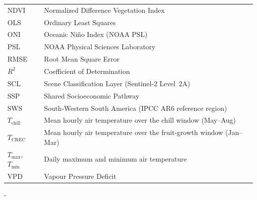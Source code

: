 \documentclass[agronomy,article,submit,pdftex,moreauthors]{Definitions/mdpi}
\begin{document}
{\begin{tabular}{@{}ll}
NDVI   & Normalized Difference Vegetation Index \\
OLS    & Ordinary Least Squares \\
ONI    & Oceanic Ni\~{n}o Index (NOAA PSL) \\
PSL    & NOAA Physical Sciences Laboratory \\
RMSE   & Root Mean Square Error \\
$R^2$  & Coefficient of Determination \\
SCL    & Scene Classification Layer (Sentinel-2 Level~2A) \\
SSP    & Shared Socioeconomic Pathway \\
SWS    & South-Western South America (IPCC AR6 reference region) \\
$T_{\text{chill}}$ & Mean hourly air temperature over the chill window (May--Aug) \\
$T_{\text{CREC}}$  & Mean hourly air temperature over the fruit-growth window (Jan--Mar) \\
$T_{\max}$, $T_{\min}$ & Daily maximum and minimum air temperature \\
VPD    & Vapour Pressure Deficit
\end{tabular}
}

\begin{adjustwidth}{-\extralength}{}




\PublishersNote{}

\end{adjustwidth}
\end{document}
